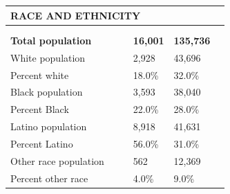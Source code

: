 \documentclass[9pt]{report}
\begin{document}
\vspace{12pt}
\setlength{\tabcolsep}{.01in} %
\begin{tabular}{p{.10in}p{.10in}p{.10in}p{3.7in}>{\hfill}p{.85in}>{\hfill}p{.85in}>{\hfill}p{.85in}>{\hfill}p{.85in}p{0.1in}}
\multicolumn{9}{l}{\parbox{7.1in}{\raggedright{\large{\strut\textbf{RACE AND ETHNICITY}\strut}}}} \\ 
\hline
\multicolumn{4}{l}{\parbox{3.5in}{\raggedright{\textbf{}}}} & \multicolumn{1}{r}{\parbox{.85in}{\strut\raggedleft{\textbf{}\strut}}} & \multicolumn{1}{r}{\parbox{.85in}{\strut\raggedleft{\textbf{}\strut}}} & \multicolumn{1}{r}{\parbox{.85in}{\strut{}}} & \multicolumn{1}{r}{\parbox{.85in}{\strut{}}} & \\ 
\multicolumn{9}{l}{} \\ 
\multicolumn{4}{l}{\parbox{3.5in}{\strut\raggedright{\textbf{Total population}\strut}}} & \textbf{} & \textbf{} & \textbf{16,001} & \textbf{135,736} & \textbf{} \\ 
\multicolumn{4}{l}{\parbox{3.6in}{\strut\raggedright{{White population}}\strut}} &  &  & 2,928 & 43,696 & \multicolumn{1}{l}{}  \\ 
\multicolumn{4}{l}{\parbox{3.6in}{\strut\raggedright{{Percent white}}\strut}} &  &  & 18.0\% & 32.0\% & \multicolumn{1}{l}{}  \\ 
\multicolumn{4}{l}{\parbox{3.6in}{\strut\raggedright{{Black population}}\strut}} &  &  & 3,593 & 38,040 & \multicolumn{1}{l}{}  \\ 
\multicolumn{4}{l}{\parbox{3.6in}{\strut\raggedright{{Percent Black}}\strut}} &  &  & 22.0\% & 28.0\% & \multicolumn{1}{l}{}  \\ 
\multicolumn{4}{l}{\parbox{3.6in}{\strut\raggedright{{Latino population}}\strut}} &  &  & 8,918 & 41,631 & \multicolumn{1}{l}{}  \\ 
\multicolumn{4}{l}{\parbox{3.6in}{\strut\raggedright{{Percent Latino}}\strut}} &  &  & 56.0\% & 31.0\% & \multicolumn{1}{l}{}  \\ 
\multicolumn{4}{l}{\parbox{3.6in}{\strut\raggedright{{Other race population}}\strut}} &  &  & 562 & 12,369 & \multicolumn{1}{l}{}  \\ 
\multicolumn{4}{l}{\parbox{3.6in}{\strut\raggedright{{Percent other race}}\strut}} &  &  & 4.0\% & 9.0\% & \multicolumn{1}{l}{}  \\ 

\end{tabular}
\setlength{\tabcolsep}{6pt} %
\end{document}
